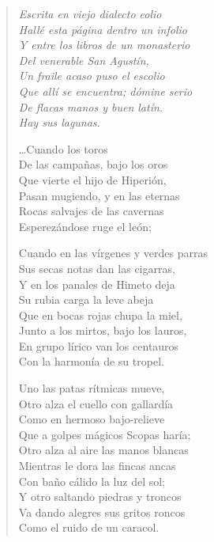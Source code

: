 \documentclass[12pt]{article}
\begin{document}
\clearpage
{}
\begin{verse}

\emph{Escrita en viejo dialecto eolio\\
Hallé esta página dentro un infolio\\
Y entre los libros de un monasterio\\
Del venerable San Agustín,\\
Un fraile acaso puso el escolio\\
Que allí se encuentra; dómine serio\\
De flacas manos y buen latín.\\
Hay sus lagunas.}  

\ldots{}Cuando los toros\\
De las campañas, bajo los oros\\
Que vierte el hijo de Hiperión,\\
Pasan mugiendo, y en las eternas\\
Rocas salvajes de las cavernas\\
Esperezándose ruge el león;  

Cuando en las vírgenes y verdes parras\\
Sus secas notas dan las cigarras,\\
Y en los panales de Himeto deja\\
Su rubia carga la leve abeja\\
Que en bocas rojas chupa la miel,\\
Junto a los mirtos, bajo los lauros,\\
En grupo lírico van los centauros\\
Con la harmonía de su tropel.  

Uno las patas rítmicas mueve,\\
Otro alza el cuello con gallardía\\
Como en hermoso bajo-relieve\\
Que a golpes mágicos Scopas haría;\\
Otro alza al aire las manos blancas\\
Mientras le dora las fincas ancas\\
Con baño cálido la luz del sol;\\
Y otro saltando piedras y troncos\\
Va dando alegres sus gritos roncos\\
Como el ruido de un caracol.  


\end{verse}
\end{document}
